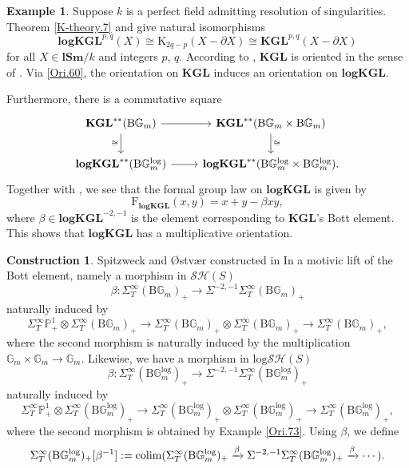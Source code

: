 \documentclass[11pt, a4paper]{amsart}
\theoremstyle{definition}
\newtheorem{const}[thm]{Construction}
\newtheorem{exm}[thm]{Example}
\numberwithin{equation}{subsection}
\renewcommand{\P}{\mathbb{P}}
\newcommand{\G}{{\mathbb{G}}}
\newcommand{\lSm}{\mathbf{lSm}}
\newcommand{\colimit}{\mathop{\rm colim}}
\newcommand{\KGL}{{\mathbf{KGL}}}
\newcommand{\Formal}{\mathrm{F}}
\newcommand{\Kth}{\mathrm{K}}
\newcommand{\clspace}{\mathrm{B}}
\newcommand{\logKGL}{\mathbf{logKGL}}
\newcommand{\Gmm}{\mathbb{G}_m^{\mathrm{log}}}
\newcommand{\infSH}{\mathcal{SH}}
\newcommand{\inflogSH}{\mathrm{log}\mathcal{SH}}
\begin{document}
\begin{exm}
\label{Ori.62}
Suppose $k$ is a perfect field admitting resolution of singularities.
Theorem \ref{K-theory.7} and \cite[Corollary 1.2.7]{PPR} give natural isomorphisms
\begin{equation}
\label{Ori.60}
\logKGL^{p,q}(X)
\cong
\Kth_{2q-p}(X-\partial X)
\cong
\KGL^{p,q}(X-\partial X)
\end{equation}
for all $X\in \lSm/k$ and integers $p$, $q$.
According to \cite[\S 2.7]{PPR}, $\KGL$ is oriented in the sense of \cite[Definition 1.2]{zbMATH05367298}.
Via \eqref{Ori.60}, the orientation on $\KGL$ induces an orientation on $\logKGL$.

Furthermore, there is a commutative square
\[
\begin{tikzcd}
\KGL^{**}(\clspace \G_m)\ar[d,"\cong"']\ar[r]&
\KGL^{**}(\clspace \G_m\times \clspace \G_m)\ar[d,"\cong"]
\\
\logKGL^{**}(\clspace \Gmm)\ar[r]&
\logKGL^{**}(\clspace \Gmm\times \clspace \Gmm).
\end{tikzcd}
\]
Together with \cite[Example 2.2]{zbMATH05549229}, 
we see that the formal group law on $\logKGL$ is given by
\begin{equation}
\Formal_{\logKGL}(x,y)=x+y-\beta xy,
\end{equation}
where $\beta\in \logKGL^{-2,-1}$ is the element corresponding to $\KGL$'s Bott element.
This shows that $\logKGL$ has a multiplicative orientation.
\end{exm}



\begin{const}
\label{ori.72}
Spitzweck and \O stv\ae r constructed in
In \cite[(4)]{zbMATH05549229}  a motivic lift of the Bott element, namely a morphism in $\infSH(S)$
\[
\beta\colon \Sigma_T^\infty (\clspace \G_m)_+
\to
\Sigma^{-2,-1}\Sigma_T^\infty (\clspace \G_m)_+
\]
naturally induced by
\[
\Sigma_T^\infty \P^1_+ \otimes \Sigma_T^\infty (\clspace \G_m)_+
\to
\Sigma_T^\infty (\clspace \G_m)_+ \otimes \Sigma_T^\infty (\clspace \G_m)_+
\to
\Sigma_T^\infty (\clspace \G_m)_+,
\]
where the second morphism is naturally induced by the multiplication $\G_m\times \G_m\to \G_m$.
Likewise,
we have a morphism in $\inflogSH(S)$
\[
\beta\colon \Sigma_T^\infty (\clspace \Gmm)_+
\to
\Sigma^{-2,-1}\Sigma_T^\infty (\clspace \Gmm)_+
\]
naturally induced by
\[
\Sigma_T^\infty \P^1_+ \otimes \Sigma_T^\infty (\clspace \Gmm)_+
\to
\Sigma_T^\infty (\clspace \Gmm)_+ \otimes \Sigma_T^\infty (\clspace \Gmm)_+
\to
\Sigma_T^\infty (\clspace \Gmm)_+,
\]
where the second morphism is obtained by Example \ref{Ori.73}.
Using $\beta$,
we define
\[
\Sigma^\infty_T (\clspace \Gmm)_+ [\beta^{-1}]
:=
\colimit(
\Sigma_T^\infty (\clspace \Gmm)_+
\xrightarrow{\beta}
\Sigma^{-2,-1}\Sigma_T^\infty (\clspace \Gmm)_+
\xrightarrow{\beta}
\cdots
).
\]
\end{const}
\end{document}
